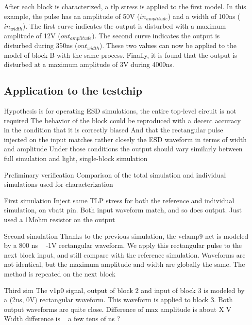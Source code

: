 After each block is characterized, a \gls{tlp} stress is applied to the first model.
In this example, the pulse has an amplitude of 50V ($in_{amplitude}$) and a width of 100ns ($in_{width}$).
The first curve indicates the output is disturbed with a maximum amplitude of 12V ($out_{amplitude}$).
The second curve indicates the output is disturbed during 350ns ($out_{width}$).
These two values can now be applied to the model of block B with the same process.
Finally, it is found that the output is disturbed at a maximum amplitude of 3V during 4000ns.

\subsection{Application to the testchip}

Hypothesis is for operating ESD simulations, the entire top-level circuit is not required
The behavior of the block could be reproduced with a decent accuracy
in the condition that it is correctly biased
And that the rectangular pulse injected on the input matches rather closely the ESD waveform in terms of width and amplitude
Under those conditions the output should vary similarly between full simulation and light, single-block simulation

Preliminary verification
Comparison of the total simulation and individual simulations used for characterization




First simulation
Inject same TLP stress for both the reference and individual simulation, on vbatt pin.
Both input waveform match, and so does output.
Just used a 1Mohm resistor on the output

Second simulation
Thanks to the previous simulation, the vclamp9 net is modeled by a 800 ns ~ -1V rectangular waveform.
We apply this rectangular pulse to the next block input, and still compare with the reference simulation.
Waveforms are not identical, but the maximum amplitude and width are globally the same.
The method is repeated on the next block

Third sim
The v1p0 signal, output of block 2 and input of block 3 is modeled by a (2us, 0V) rectangular waveform.
This waveform is applied to block 3.
Both output waveforms are quite close.
Difference of max amplitude is about X V
Width difference is ~ a few tens of ns ?


